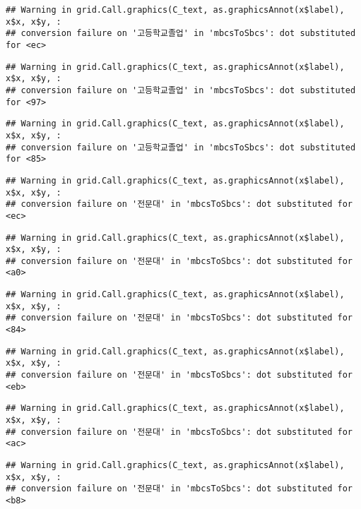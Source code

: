 \documentclass[
]{article}
\begin{document}
\begin{verbatim}
## Warning in grid.Call.graphics(C_text, as.graphicsAnnot(x$label), x$x, x$y, :
## conversion failure on '고등학교졸업' in 'mbcsToSbcs': dot substituted for <ec>
\end{verbatim}

\begin{verbatim}
## Warning in grid.Call.graphics(C_text, as.graphicsAnnot(x$label), x$x, x$y, :
## conversion failure on '고등학교졸업' in 'mbcsToSbcs': dot substituted for <97>
\end{verbatim}

\begin{verbatim}
## Warning in grid.Call.graphics(C_text, as.graphicsAnnot(x$label), x$x, x$y, :
## conversion failure on '고등학교졸업' in 'mbcsToSbcs': dot substituted for <85>
\end{verbatim}

\begin{verbatim}
## Warning in grid.Call.graphics(C_text, as.graphicsAnnot(x$label), x$x, x$y, :
## conversion failure on '전문대' in 'mbcsToSbcs': dot substituted for <ec>
\end{verbatim}

\begin{verbatim}
## Warning in grid.Call.graphics(C_text, as.graphicsAnnot(x$label), x$x, x$y, :
## conversion failure on '전문대' in 'mbcsToSbcs': dot substituted for <a0>
\end{verbatim}

\begin{verbatim}
## Warning in grid.Call.graphics(C_text, as.graphicsAnnot(x$label), x$x, x$y, :
## conversion failure on '전문대' in 'mbcsToSbcs': dot substituted for <84>
\end{verbatim}

\begin{verbatim}
## Warning in grid.Call.graphics(C_text, as.graphicsAnnot(x$label), x$x, x$y, :
## conversion failure on '전문대' in 'mbcsToSbcs': dot substituted for <eb>
\end{verbatim}

\begin{verbatim}
## Warning in grid.Call.graphics(C_text, as.graphicsAnnot(x$label), x$x, x$y, :
## conversion failure on '전문대' in 'mbcsToSbcs': dot substituted for <ac>
\end{verbatim}

\begin{verbatim}
## Warning in grid.Call.graphics(C_text, as.graphicsAnnot(x$label), x$x, x$y, :
## conversion failure on '전문대' in 'mbcsToSbcs': dot substituted for <b8>
\end{verbatim}
\end{document}
